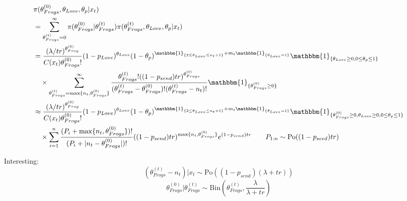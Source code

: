 \documentclass[10pt, a4paper]{article}
\begin{document}
    \begin{align*}
        &\pi(\theta_{Frogs}^{(0)},\theta_{Love}, \theta_p|x_t) \\
        &= \sum_{\theta_{Frogs}^{(t)}=0}^{\infty}\pi(\theta_{Frogs}^{(0)}|\theta_{Frogs}^{(t)})\pi(\theta_{Frogs}^{(t)},\theta_{Love}, \theta_p|x_t) \\
        &= \frac{(\lambda/tr)^{\theta_{Frog}^{(0)}}}{C(x_t)\theta_{Frogs}^{(0)}!}(1-p_{Love})^{\theta_{Love}}(1-\theta_p)^{\mathbbm{1}_{\{2\leq\theta_{Love}\leq n_t+1\}} + m_t\mathbbm{1}_{\{\theta_{Love} = 1\}}}\mathbbm{1}_{\{\theta_{Love}\geq 0, 0 \leq \theta_p \leq 1\}} \\&\quad\times \sum_{\theta_{Frogs}^{(t)}=\max\{n_t, \theta_{Frogs}^{(0)}\}}^{\infty} \frac{\theta_{Frogs}^{(t)}!((1-p_{send})tr)^{\theta_{Frogs}^{(t)}}}{(\theta_{Frogs}^{(t)}-\theta_{Frogs}^{(0)})!(\theta_{Frogs}^{(t)}-n_t)!} \mathbbm{1}_{\{\theta_{Frogs}^{(0)}\geq 0\}} \\
        &\approx \frac{(\lambda/tr)^{\theta_{Frog}^{(0)}}}{C(x_t)\theta_{Frogs}^{(0)}!}(1-p_{Love})^{\theta_{Love}}(1-\theta_p)^{\mathbbm{1}_{\{2\leq\theta_{Love}\leq n_t+1\}} + m_t\mathbbm{1}_{\{\theta_{Love} = 1\}}}\mathbbm{1}_{\{\theta_{Frogs}^{(0)}\geq 0, \theta_{Love}\geq 0, 0 \leq \theta_p \leq 1\}} \\&\quad\times \sum_{i=1}^{n} \frac{(P_i+\max\{n_t, \theta_{Frogs}^{(0)}\})!}{(P_i+|n_t-\theta_{Frogs}^{(0)}|)!}((1-p_{send})tr)^{\max\{n_t, \theta_{Frogs}^{(0)}\}}e^{(1-p_{send})tr} \qquad P_{1:n} \sim \mathrm{Po}((1-p_{seed})tr) \\
    \end{align*}

    Interesting: $$(\theta_{Frogs}^{(t)} - n_t)|x_t \sim \mathrm{Po}((1-p_{send})(\lambda+tr))$$ $$\theta_{Frogs}^{(0)}|\theta_{Frogs}^{(t)} \sim \mathrm{Bin}\left(\theta_{Frogs}^{(t)}, \frac{\lambda}{\lambda+tr}\right)$$
\end{document}
